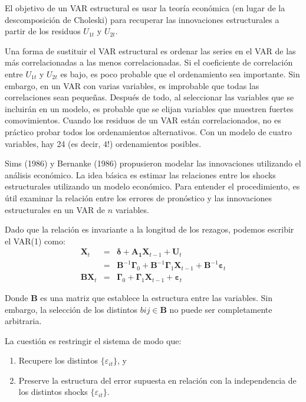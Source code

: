 \documentclass[
]{book}
\begin{document}
El objetivo de un VAR estructural es usar la teoría económica (en lugar de la descomposición de Choleski) para recuperar las innovaciones estructurales a partir de los residuos \(U_{1t}\) y \(U_{2t}\).

Una forma de sustituir el VAR estructural es ordenar las series en el VAR de las más correlacionadas a las menos correlacionadas. Si el coeficiente de correlación entre \(U_{1t}\) y \(U_{2t}\) es bajo, es poco probable que el ordenamiento sea importante. Sin embargo, en un VAR con varias variables, es improbable que todas las correlaciones sean pequeñas. Después de todo, al seleccionar las variables que se incluirán en un modelo, es probable que se elijan variables que muestren fuertes comovimientos. Cuando los residuos de un VAR están correlacionados, no es práctico probar todos los ordenamientos alternativos. Con un modelo de cuatro variables, hay 24 (es decir, \(4!\)) ordenamientos posibles.

Sims (1986) y Bernanke (1986) propusieron modelar las innovaciones utilizando el análisis económico. La idea básica es estimar las relaciones entre los shocks estructurales utilizando un modelo económico. Para entender el procedimiento, es útil examinar la relación entre los errores de pronóstico y las innovaciones estructurales en un VAR de \(n\) variables.

Dado que la relación es invariante a la longitud de los rezagos, podemos escribir el VAR(1) como:
\begin{eqnarray*}
    \mathbf{X}_t & = & \boldsymbol{\delta} + \mathbf{A_1} \mathbf{X}_{t-1} + \mathbf{U}_{t} \\
    & = & \mathbf{B}^{-1} \mathbf{\Gamma}_{0} + \mathbf{B}^{-1} \mathbf{\Gamma}_{1} \mathbf{X}_{t-1} + \mathbf{B}^{-1} \mathbf{\varepsilon}_{t} \\
    \mathbf{B} \mathbf{X}_t & = & \mathbf{\Gamma}_{0} + \mathbf{\Gamma}_{1} \mathbf{X}_{t-1} + \mathbf{\varepsilon}_{t}
\end{eqnarray*}

Donde \(\mathbf{B}\) es una matriz que establece la estructura entre las variables. Sin embargo, la selección de los distintos \(bij \in \mathbf{B}\) no puede ser completamente arbitraria.

La cuestión es restringir el sistema de modo que:

\begin{enumerate}
    \item Recupere los distintos $\{ \varepsilon_{it} \}$, y 
    
    \item Preserve la estructura del error supuesta en relación con la independencia de los distintos shocks $\{ \varepsilon_{it} \}$.
\end{enumerate}
\end{document}
